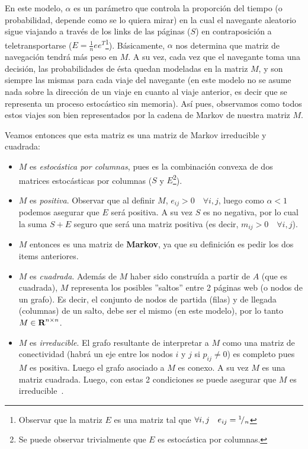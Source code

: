 \par En este modelo, $\alpha$ es un par\'ametro que controla la proporci\'on del
tiempo (o probabilidad, depende como se lo quiera mirar) en la cual el navegante
aleatorio sigue viajando a trav\'es de los links de las p\'aginas ($S$)
en contraposici\'on a teletransportarse ($E = \frac{1}{n}ee^T$\footnote{Observar
que la matriz $E$ es una matriz tal que $\forall i,j \quad e_{ij} =
{}^{1}\!/_{n}$}). B\'asicamente, $\alpha$ nos determina que matriz de
navegaci\'on tendr\'a m\'as peso en $M$. A su vez, cada vez que el navegante
toma una decisi\'on, las probabilidades de \'esta quedan modeladas en la
matriz $M$, y son siempre las mismas para cada viaje del navegante (en este modelo
no se asume nada sobre la direcci\'on de un viaje en cuanto al viaje anterior,
es decir que se representa un proceso estoc\'astico sin memoria). As\'i pues,
observamos como todos estos viajes son bien representados por la cadena de
Markov de nuestra matriz $M$.

\par Veamos entonces que esta matriz es una matriz de Markov irreducible y
cuadrada:

\begin{itemize}
    \item $M$ es \textit{estoc\'astica por columnas}, pues es la combinaci\'on convexa de
        dos matrices estoc\'asticas por columnas ($S$ y $E$\footnote{Se puede
        observar trivialmente que $E$ es estoc\'astica por columnas.}).

    \item $M$ es \textit{positiva}. Observar que al definir $M$, $e_{ij} >
        0\quad\forall i,j$, luego como $\alpha < 1$ podemos asegurar que $E$
        ser\'a positiva. A su vez $S$ es no negativa, por lo cual la suma $S+E$
        seguro que ser\'a una matriz positiva (es decir, $m_{ij} > 0
        \quad\forall i,j$).

    \item $M$ entonces es una matriz de \textbf{Markov}, ya que su definici\'on
        es pedir los dos items anteriores.

    \item $M$ es \textit{cuadrada}. Adem\'as de $M$ haber sido constru\'ida a
        partir de $A$ (que es cuadrada), $M$ representa los posibles ''saltos''
        entre 2 p\'aginas web (o nodos de un grafo). Es decir, el conjunto de
        nodos de partida (filas) y de llegada (columnas) de un salto, debe ser
        el mismo (en este modelo), por lo tanto $M\in\hbox{\bf R}^{n\times n}$.

    \item $M$ es \textit{irreducible}. El grafo resultante de interpretar a $M$
        como una matriz de conectividad (habr\'a un eje entre los nodos $i$ y
        $j$ si $p_{ij}\neq 0$) es completo pues $M$ es positiva.  Luego el grafo
        asociado a $M$ es conexo. A su vez $M$ es una matriz cuadrada. Luego,
        con estas 2 condiciones se puede asegurar que $M$ es
        irreducible~\cite[p.671]{Meyer2000}.
\end{itemize}
\smallskip

